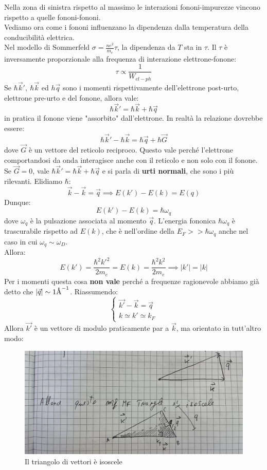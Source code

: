 \documentclass{book}
\begin{document}
        Nella zona di sinistra rispetto al massimo le interazioni fononi-impurezze vincono rispetto a quelle fononi-fononi.\\
        Vediamo ora come i fononi influenzano la dipendenza dalla temperatura della conducibilità elettrica.\\
        Nel modello di Sommerfeld $\sigma = \displaystyle \frac{n e^{2}}{m_{e}}\tau $, la dipendenza da $T$ sta in $\tau$. Il $\tau$ è inversamente proporzionale alla frequenza di interazione elettrone-fonone:
        $$\tau \propto \frac{1}{W_{el-ph}}$$
        Se $\hbar \vec{k}', \ \hbar \vec{k}$ ed $h \vec{q}$ sono i momenti rispettivamente dell'elettrone post-urto, elettrone pre-urto e del fonone, allora vale:
        $$\hbar \vec{k} ' = \hbar \vec{k} +\hbar \vec{q}$$
        in pratica il fonone viene "assorbito" dall'elettrone. In realtà la relazione dovrebbe essere:
        $$\hbar \vec{k} ' - \hbar \vec{k} = \hbar \vec{q} + \hbar \vec{G}$$
        dove $\vec{G}$ è un vettore del reticolo reciproco. Questo vale perché l'elettrone comportandosi da onda interagisce anche con il reticolo e non solo con il fonone.\\
        Se $\vec{G} = 0$, vale $\hbar \vec{k} ' = \hbar \vec{k}+\hbar \vec{q}$ e si parla di \textbf{urti normali}, che sono i più rilevanti.
        Elidiamo $\hbar$:
        $$\vec{k}-\vec{k} = \vec{q} \implies E(k') - E(k) = E(q)$$
        Dunque:
        $$E(k') -E(k) =  \hbar \omega_{q}$$
        dove $\omega_{q}$ è la pulsazione associata al momento $\vec{q}$.
        L'energia fononica $\hbar \omega_{q}$ è trascurabile rispetto ad $E(k)$, che è nell'ordine della $E_{F} >> \hbar \omega_{q}$ anche nel caso in cui $\omega_{q} \sim \omega_{D}$.\\
        Allora:
        $$E(k') = \frac{\hbar ^{2} k'^{2}}{2m_{e}} = E(k) = \frac{\hbar ^{2}k^{2}}{2m_{e}} \implies |k'| = |k|$$
        Per i momenti questa cosa \textbf{non vale} perché a frequenze ragionevole abbiamo già detto che $|\vec{q}| \sim 1 \textrm{\si{\angstrom}} ^{-1}$.
        Riassumendo:
        $$\begin{cases}
            \vec{k'}-\vec{k} = \vec{q} \\
            k \simeq k' \simeq k_{F}
        \end{cases}$$
        Allora $\vec{k'}$ è un vettore di modulo praticamente par a $\vec{k}$, ma orientato in tutt'altro modo:
        \begin{figure}[h!]
            \centering
            \includegraphics[width=0.85\linewidth]{img/pippo.png}
            \caption{Il triangolo di vettori è isoscele}
        \end{figure} \\
\end{document}
